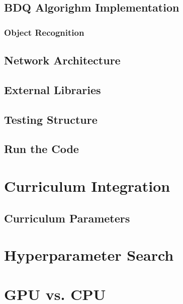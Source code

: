     \subsection{BDQ Algorighm Implementation}
    \subsubsection{Object Recognition}
    \subsection{Network Architecture}
    \subsection{External Libraries}
    \subsection{Testing Structure}
    \subsection{Run the Code}
\section{Curriculum Integration}
    \subsection{Curriculum Parameters}
\section{Hyperparameter Search}
\section{GPU vs. CPU}
